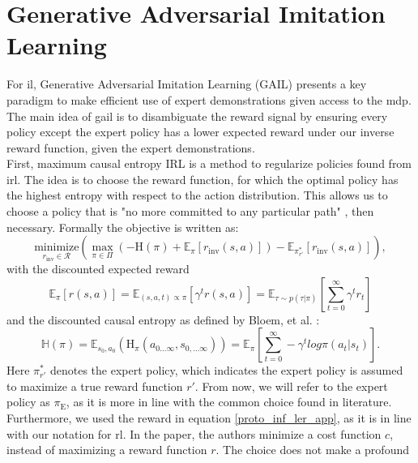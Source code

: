 \chapter{Generative Adversarial Imitation Learning}
\label{app:GAIL}
For \ac{il}, Generative Adversarial Imitation Learning (GAIL) 
\cite{ho2016generative} presents a key paradigm to make efficient use of expert demonstrations given access to the \ac{mdp}. 
The main idea of \ac{gail} is to disambiguate the reward signal 
by ensuring every policy except the expert policy has a lower expected reward under our inverse reward function, given the expert 
demonstrations.\\ 
First, 
maximum causal entropy IRL \cite{10.5555/3104322.3104481} is a method to regularize policies found from \ac{irl}. The idea is to choose the reward function, for 
which the optimal policy has the highest entropy with respect to the action distribution. This allows us to choose a policy that is "no more committed to any 
particular path" \cite[p.2]{10.5555/3104322.3104481}, then necessary. Formally the objective is written as:
\begin{equation*}
    \label{proto_inf_ler_app}
    \underset{r_{\text{inv}} \in \mathcal{R}}{\text{minimize}} \left( \max_{\pi \in \Pi} \left( - \text{H}(\pi) + \mathbb{E}_{\pi}[r_{\text{inv}}(s, a)] \right) - \mathbb{E}_{\pi_{r'}^*}[r_{\text{inv}}(s,a)] \right),
\end{equation*}
with the discounted expected reward
\begin{equation*}
    \mathbb{E}_{\pi}[r(s, a)] =
    \mathbb{E}_{(s,a,t) \propto \pi}[\gamma^t r(s,a)] = 
    \mathbb{E}_{\tau \sim p(\tau | \pi)} \left[ \sum_{t=0}^\infty \gamma^t r_t \right]
\end{equation*}
and the discounted causal entropy as defined by Bloem, et al. \cite{InfCausalEnt}:
\begin{equation*}
    \mathbb{H}(\pi) = \mathbb{E}_{s_0, a_0} \left(\text{H}_{\pi}(a_{0...\infty}, s_{0,...\infty})\right) = \mathbb{E}_{\pi}\left[\sum_{t=0}^\infty -\gamma^t log \pi(a_t|s_t)\right].
\end{equation*}
Here $\pi_{r'}^*$ denotes the expert policy, which indicates the expert policy is assumed to maximize a true 
reward function ${r'}$. From now, we will refer to the expert policy as $\pi_{\text{E}}$, as it is more in line with the common choice found in 
literature. Furthermore, we used the reward in equation  \ref{proto_inf_ler_app}, as it is in line with our notation for \ac{rl}. In the paper, 
the authors minimize a cost function $c$, instead of maximizing a reward function $r$. The choice does not make a profound 
